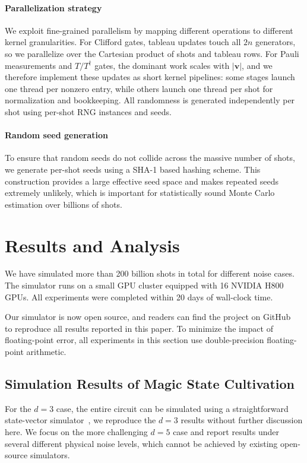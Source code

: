 \documentclass[10pt,conference]{IEEEtran}
\begin{document}
\paragraph{Parallelization strategy}
We exploit fine-grained parallelism by mapping different operations to different kernel granularities.
For Clifford gates, tableau updates touch all $2n$ generators, so we parallelize over the Cartesian product of shots and tableau rows.
For Pauli measurements and $T/T^\dagger$ gates, the dominant work scales with $|\mathbf{v}|$, and we therefore implement these updates as short kernel pipelines: some stages launch one thread per nonzero entry, while others launch one thread per shot for normalization and bookkeeping.
All randomness is generated independently per shot using per-shot RNG instances and seeds.

\paragraph{Random seed generation}
To ensure that random seeds do not collide across the massive number of shots, we generate per-shot seeds using a SHA-1 based hashing scheme. 
This construction provides a large effective seed space and makes repeated seeds extremely unlikely, which is important for statistically sound Monte Carlo estimation over billions of shots.

\section{Results and Analysis}
\label{sec:results}
We have simulated more than 200 billion shots in total for different noise cases. The simulator runs on a small GPU cluster equipped with 16 NVIDIA H800 GPUs. All experiments were completed within 20 days of wall-clock time.

Our simulator is now open source, and readers can find the project on GitHub~\cite{SOFT2025} to reproduce all results reported in this paper. To minimize the impact of floating-point error, all experiments in this section use double-precision floating-point arithmetic.

\subsection{Simulation Results of Magic State Cultivation}
\label{subsec:msc_effectiveness}

For the $d=3$ case, the entire circuit can be simulated using a straightforward state-vector simulator~\cite{gidney2024magic}, we reproduce the $d=3$ results without further discussion here. We focus on the more challenging $d=5$ case and report results under several different physical noise levels, which cannot be achieved by existing open-source simulators.
\end{document}
